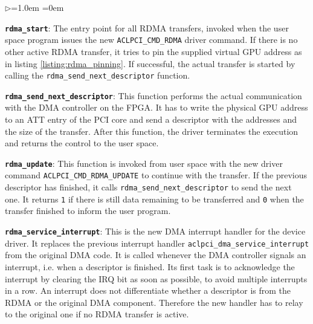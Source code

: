 \begin{list}{$\triangleright$}{\leftmargin=1.0em \itemindent=0em}
	\item {\bf \texttt{rdma\_start}}: The entry point for all RDMA transfers, invoked when the user space program issues the new \texttt{ACLPCI\_CMD\_RDMA} driver command.
	If there is no other active RDMA transfer, it tries to pin the supplied virtual GPU address as in listing \ref{listing:rdma_pinning}.
	If successful, the actual transfer is started by calling the \texttt{rdma\_send\_next\_descriptor} function.
	
	
	
	\item {\bf \texttt{rdma\_send\_next\_descriptor}}:
	This function performs the actual communication with the DMA controller on the FPGA.
	It has to write the physical GPU address to an ATT entry of the PCI core and send a descriptor with the addresses and the size of the transfer.
	After this function, the driver terminates the execution and returns the control to the user space.
	



	
	
	\item {\bf \texttt{rdma\_update}}: This function is invoked from user space with the new driver command \texttt{ACLPCI\_CMD\_RDMA\_UPDATE} to continue with the transfer.
	If the previous descriptor has finished, it calls \texttt{rdma\_send\_next\_descriptor} to send the next one.
	It returns \texttt{1} if there is still data remaining to be transferred and \texttt{0} when the transfer finished to inform the user program.
	
	
	
	\item {\bf \texttt{rdma\_service\_interrupt}}: This is the new DMA interrupt handler for the device driver.
	It replaces the previous interrupt handler \texttt{aclpci\_dma\_service\_interrupt} from the original DMA code.
	It is called whenever the DMA controller signals an interrupt, i.e. when a descriptor is finished.
	Its first task is to acknowledge the interrupt by clearing the IRQ bit as soon as possible, to avoid multiple interrupts in a row.
	An interrupt does not differentiate whether a descriptor is from the RDMA or the original DMA component.
	Therefore the new handler has to relay to the original one if no RDMA transfer is active.
	

\end{list}
